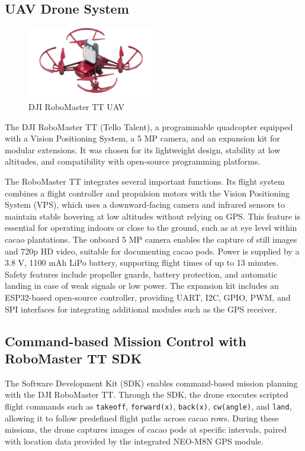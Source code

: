 \subsection{UAV Drone System}

\begin{figure}[H]
	\centering
	\caption{DJI RoboMaster TT UAV}
	\label{fig:robomaster_tt}
	\includegraphics[width=0.5\textwidth]{figures/Robomaster_TT.pdf}
\end{figure}


The DJI RoboMaster TT (Tello Talent), a programmable quadcopter
equipped with a Vision Positioning System, a 5 MP camera, and an expansion kit for modular extensions.
It was chosen for its lightweight design, stability at low altitudes, and compatibility with open-source
programming platforms.

The RoboMaster TT integrates several important functions. Its flight system combines a flight controller
and propulsion motors with the Vision Positioning System (VPS), which uses a downward-facing camera and
infrared sensors to maintain stable hovering at low altitudes without relying on GPS. This feature is
essential for operating indoors or close to the ground, such as at eye level within cacao plantations.
The onboard 5 MP camera enables the capture of still images and 720p HD video, suitable for documenting
cacao pods. Power is supplied by a 3.8 V, 1100 mAh LiPo battery, supporting flight times of up to
13 minutes. Safety features include propeller guards, battery protection, and automatic landing in case
of weak signals or low power. The expansion kit includes an ESP32-based open-source controller, providing
UART, I2C, GPIO, PWM, and SPI interfaces for integrating additional modules such as the GPS receiver.

\subsection{Command-based Mission Control with RoboMaster TT SDK}
The Software Development Kit (SDK) enables command-based mission planning with the
DJI RoboMaster TT. Through the SDK, the drone executes scripted flight commands such as
\texttt{takeoff}, \texttt{forward(x)}, \texttt{back(x)}, \texttt{cw(angle)}, and \texttt{land},
allowing it to follow predefined flight paths across cacao rows. During these missions, the drone
captures images of cacao pods at specific intervals, paired with location data provided by the
integrated NEO-M8N GPS module.

